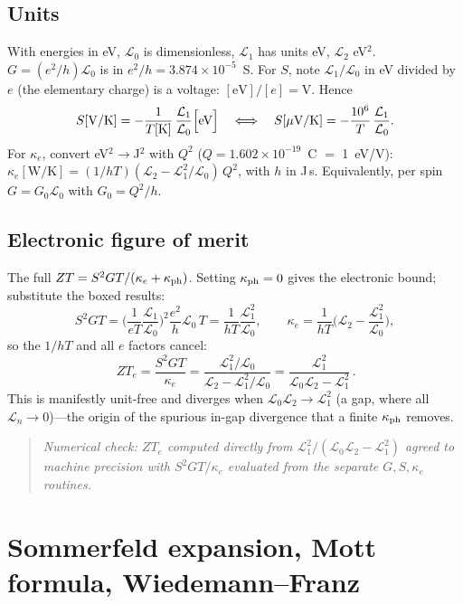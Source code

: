 \documentclass[11pt]{article}
\newcommand{\Lloc}{\mathcal{L}}
\begin{document}
\subsection{Units}
With energies in eV, $\Lloc_0$ is dimensionless, $\Lloc_1$ has units eV, $\Lloc_2$ eV$^2$.
$G=(e^2/h)\Lloc_0$ is in $e^2/h=3.874\times10^{-5}$~S. For $S$, note $\Lloc_1/\Lloc_0$ in eV
divided by $e$ (the elementary charge) is a voltage: $[\text{eV}]/[e]=\text{V}$. Hence
\begin{equation}
S[\text{V/K}]=-\frac{1}{T[\text K]}\,\frac{\Lloc_1}{\Lloc_0}\Big[\text{eV}\Big]
\quad\Longleftrightarrow\quad
S[\mu\text{V/K}]=-\frac{10^6}{T}\,\frac{\Lloc_1}{\Lloc_0}.
\end{equation}
For $\kappa_e$, convert eV$^2\to$J$^2$ with $Q^2$ ($Q=1.602\times10^{-19}$~C $=$ 1~eV/V):
$\kappa_e[\text{W/K}]=(1/hT)(\Lloc_2-\Lloc_1^2/\Lloc_0)\,Q^2$, with $h$ in J\,s. Equivalently, per
spin $G=G_0\Lloc_0$ with $G_0=Q^2/h$.

\subsection{Electronic figure of merit}
The full $ZT=S^2GT/(\kappa_e+\kappa_{\rm ph})$. Setting $\kappa_{\rm ph}=0$ gives the electronic
bound; substitute the boxed results:
\begin{equation}
S^2GT=\Big(\frac{1}{eT}\frac{\Lloc_1}{\Lloc_0}\Big)^2\frac{e^2}{h}\Lloc_0\,T
=\frac{1}{hT}\frac{\Lloc_1^2}{\Lloc_0},\qquad
\kappa_e=\frac{1}{hT}\Big(\Lloc_2-\frac{\Lloc_1^2}{\Lloc_0}\Big),
\end{equation}
so the $1/hT$ and all $e$ factors cancel:
\begin{equation}
\boxed{\,ZT_e=\frac{S^2GT}{\kappa_e}=\frac{\Lloc_1^2/\Lloc_0}{\Lloc_2-\Lloc_1^2/\Lloc_0}
=\frac{\Lloc_1^2}{\Lloc_0\Lloc_2-\Lloc_1^2}\,.}
\end{equation}
This is manifestly unit-free and diverges when $\Lloc_0\Lloc_2\to\Lloc_1^2$ (a gap, where all
$\Lloc_n\to0$)---the origin of the spurious in-gap divergence that a finite $\kappa_{\rm ph}$
removes.
\begin{quote}\small\itshape
Numerical check: $ZT_e$ computed directly from $\Lloc_1^2/(\Lloc_0\Lloc_2-\Lloc_1^2)$ agreed to
machine precision with $S^2GT/\kappa_e$ evaluated from the separate $G,S,\kappa_e$ routines.
\end{quote}

\section{Sommerfeld expansion, Mott formula, Wiedemann--Franz}
\end{document}
